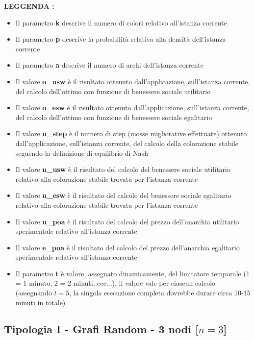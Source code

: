 \textbf{LEGGENDA : }

\begin{itemize}
	\item Il parametro \textbf{k} descrive il numero di colori relativo all'istanza corrente
	\item Il parametro \textbf{p} descrive la probabilità relativa alla densità dell'istanza corrente
	\item Il parametro \textbf{a} descrive il numero di archi dell'istanza corrente
	\item Il valore \textbf{o\_usw} è il risultato ottenuto dall'applicazione, sull'istanza corrente, del calcolo dell'ottimo con funzione di benessere sociale utilitario
	\item Il valore \textbf{o\_esw} è il risultato ottenuto dall'applicazione, sull'istanza corrente, del calcolo dell'ottimo con funzione di benessere sociale egalitario
	\item Il valore \textbf{n\_step} è il numero di step (mosse migliorative effettuate) ottenuto dall'applicazione, sull'istanza corrente, del calcolo della colorazione stabile seguendo la definizione di equilibrio di Nash
	\item Il valore \textbf{n\_usw} è il risultato del calcolo del benessere sociale utilitario relativo alla colorazione stabile trovata per l'istanza corrente
	\item Il valore \textbf{n\_esw} è il risultato del calcolo del benessere sociale egalitario relativo alla colorazione stabile trovata per l'istanza corrente
	\item Il valore \textbf{u\_poa} è il risultato del calcolo del prezzo dell'anarchia utilitario sperimentale relativo all'istanza corrente
	\item Il valore \textbf{e\_poa} è il risultato del calcolo del prezzo dell'anarchia egalitario sperimentale relativo all'istanza corrente
	\item Il parametro \textbf{t} è valore, assegnato dinamicamente, del limitatore temporale (1 = 1 minuto, 2 = 2 minuti, ecc...), il valore vale per ciascun calcolo (assegnando \(t = 5\), la singola esecuzione completa dovrebbe durare circa 10-15 minuti in totale)
\end{itemize}


\subsection{Tipologia I - Grafi Random - 3 nodi [$n=3$]}

